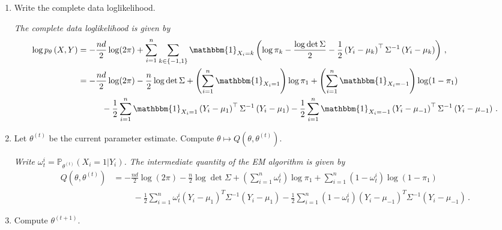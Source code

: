 \documentclass[a4paper,10pt,fleqn]{article}
\newcommand{\eqsp}{\,}
\newcommand{\bP}{\mathbb{P}}
\newcommand{\1}{\ensuremath{\mathbbm{1}}}
\begin{document}
\begin{enumerate}
\item Write the complete data loglikelihood.

\vspace{.2cm}

{\em
The complete data loglikelihood  is given by
\begin{align*}
\log p_{\theta}\left(X,Y\right) &= - \frac{nd}{2} \log(2\pi)+\sum_{i=1}^n\sum_{k\in\{-1,1\}}\1_{X_i=k}\left(\log \pi_{k} -\frac{\log \det \Sigma}{2} - \frac{1}{2}\left(Y_i - \mu_{k}\right)^\top\Sigma^{-1}\left(Y_i - \mu_{k}\right)\right) \eqsp,\\
&= - \frac{nd}{2} \log(2\pi)-\frac{n}2 \log\det\Sigma + \left(\sum_{i=1}^n\1_{X_i=1}\right)\log \pi_1 + \left(\sum_{i=1}^n\1_{X_i=-1}\right)\log (1-\pi_{1})\\
& \hspace{1cm}-  \frac{1}{2}\sum_{i=1}^n\1_{X_i=1}\left(Y_i - \mu_{1}\right)^\top\Sigma^{-1}\left(Y_i - \mu_{1}\right) -  \frac{1}{2}\sum_{i=1}^n\1_{X_i=-1}\left(Y_i - \mu_{-1}\right)^\top\Sigma^{-1}\left(Y_i - \mu_{-1}\right)\eqsp.
\end{align*}
}
\item Let $\theta^{(t)}$ be the current parameter estimate. Compute $\theta\mapsto Q(\theta,\theta^{(t)})$.

\vspace{.2cm}

{\em
Write $\omega_t^i = \bP_{\theta^{(t)}}(X_i=1|Y_i)$. The intermediate quantity of the EM algorithm is given by
\begin{align*}
Q(\theta,\theta^{(t)}) &= - \frac{nd}{2} \log(2\pi)-\frac{n}2 \log\det\Sigma + \left(\sum_{i=1}^n\omega_t^i \right)\log \pi_1 + \sum_{i=1}^n\left(1 - \omega_t^i \right)\log (1-\pi_{1})\\
& \hspace{1cm}-  \frac{1}{2}\sum_{i=1}^n\omega_t^i \left(Y_i - \mu_{1}\right)^T\Sigma^{-1}\left(Y_i - \mu_{1}\right) -  \frac{1}{2}\sum_{i=1}^n(1-\omega_t^i )\left(Y_i - \mu_{-1}\right)^T\Sigma^{-1}\left(Y_i - \mu_{-1}\right)\eqsp.
\end{align*}
}
\item Compute $\theta^{(t+1)}$.

\vspace{.2cm}


\end{enumerate}
\end{document}
